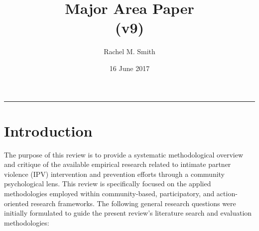 \documentclass[11pt,]{tufte-book}
\title{Major Area Paper\\
(v9)}
\author{Rachel M. Smith}
\date{16 June 2017}
\newcommand{\Frule}{
    \vspace*{-1em}
    \begin{fullwidth}\textcolor{blublk}{\rule{\linewidth}{0.2mm}}\end{fullwidth}
}
\begin{document}
\maketitle



{
\setcounter{tocdepth}{1}
\tableofcontents
}

\makeatletter
\def\LT@makenoprefixcaption#1#2#3{%
  \LT@mcol\LT@cols c{\hbox to\z@{\hss\parbox[t]\LTcapwidth{
    \sbox\@tempboxa{#1{}#3}
    \ifdim\wd\@tempboxa>\hsize
      #1{}#3
    \else
      \hbox to\hsize{\hfil\box\@tempboxa\hfil}%
    \fi
    \endgraf\vskip\baselineskip}
  \hss}}}
\makeatother

\makeatletter
\let\LT@oldmakecaption=\LT@makecaption
\let\oldthetable=\thetable
\let\oldtheHtable=\theHtable
\makeatother

\makeatletter
{}
\newenvironment{no-prefix-table-caption}{
  \let\LT@makecaption=\LT@makenoprefixcaption
  \renewcommand\thetable{x.\thetableno}
  \renewcommand\theHtable{x.\thetableno}
  \stepcounter{tableno}
}{
  \let\thetable=\oldthetable
  \let\theHtable=\oldtheHtable
  \let\LT@makecaption=\LT@oldmakecaption
  \addtocounter{table}{-1}
}
\makeatother

\newcommand{\plusnamesingular}{}
\newcommand{\starnamesingular}{}
\newcommand{\xrefname}[1]{\protect\renewcommand{\plusnamesingular}{#1}}
\newcommand{\Xrefname}[1]{\protect\renewcommand{\starnamesingular}{#1}}
\providecommand{\cref}{\plusnamesingular~\ref}
\providecommand{\Cref}{\starnamesingular~\ref}
\providecommand{\crefformat}[2]{}
\providecommand{\Crefformat}[2]{}

\crefformat{table}{Table~#2#1#3}
\Crefformat{table}{Table~#2#1#3}
\crefformat{figure}{Figure~#2#1#3}
\Crefformat{figure}{Figure~#2#1#3}

\Frule

\chapter{Introduction}\label{introduction}

The purpose of this review is to provide a systematic methodological
overview and critique of the available empirical research related to
intimate partner violence (IPV) intervention and prevention efforts
through a community psychological lens. This review is specifically
focused on the applied methodologies employed within community-based,
participatory, and action-oriented research frameworks. The following
general research questions were initially formulated to guide the
present review's literature search and evaluation methodologies:
\end{document}
